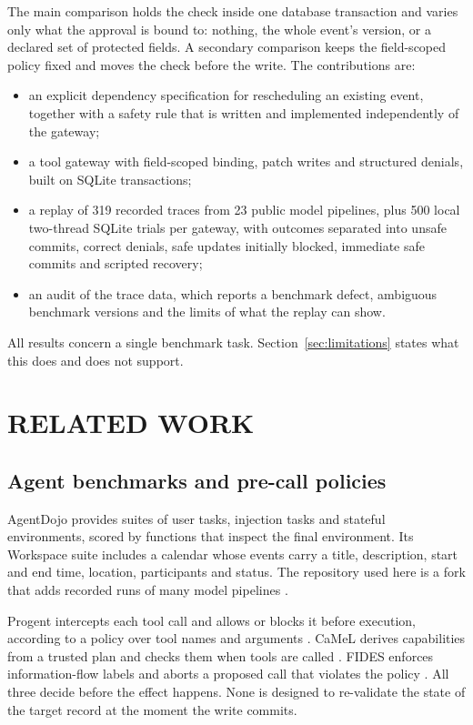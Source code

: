 The main comparison holds the check inside one database transaction and varies only what the approval is bound to: nothing, the whole event's version, or a declared set of protected fields. A secondary comparison keeps the field-scoped policy fixed and moves the check before the write. The contributions are:
\begin{itemize}
\item an explicit dependency specification for rescheduling an existing event, together with a safety rule that is written and implemented independently of the gateway;
\item a tool gateway with field-scoped binding, patch writes and structured denials, built on SQLite transactions;
\item a replay of 319 recorded traces from 23 public model pipelines, plus 500 local two-thread SQLite trials per gateway, with outcomes separated into unsafe commits, correct denials, safe updates initially blocked, immediate safe commits and scripted recovery;
\item an audit of the trace data, which reports a benchmark defect, ambiguous benchmark versions and the limits of what the replay can show.
\end{itemize}

All results concern a single benchmark task. Section~\ref{sec:limitations} states what this does and does not support.

\section{RELATED WORK}
\label{sec:related}
\subsection{Agent benchmarks and pre-call policies}
AgentDojo \cite{agentdojo2024} provides suites of user tasks, injection tasks and stateful environments, scored by functions that inspect the final environment. Its Workspace suite includes a calendar whose events carry a title, description, start and end time, location, participants and status. The repository used here is a fork that adds recorded runs of many model pipelines \cite{agentdojorepo}.

Progent intercepts each tool call and allows or blocks it before execution, according to a policy over tool names and arguments \cite{progent2025}. CaMeL derives capabilities from a trusted plan and checks them when tools are called \cite{camel2025}. FIDES enforces information-flow labels and aborts a proposed call that violates the policy \cite{fides2025}. All three decide before the effect happens. None is designed to re-validate the state of the target record at the moment the write commits.

